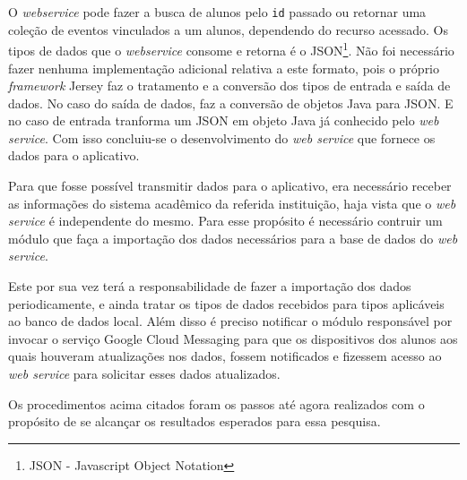 		\par O \textit{webservice} pode fazer a busca de alunos pelo \texttt{id}
passado ou retornar uma coleção de eventos vinculados a um alunos, dependendo
do recurso acessado. Os tipos de dados que o \textit{webservice} consome e
retorna é o JSON\footnote{JSON - Javascript Object Notation}. Não foi
necessário fazer nenhuma implementação adicional relativa a este formato, pois
o próprio \textit{framework} Jersey faz o tratamento e a conversão dos tipos de
entrada e saída de dados. No caso do saída de dados, faz a conversão de objetos 
Java para JSON. E no caso de entrada tranforma um JSON em objeto
Java já conhecido pelo \textit{web service}. Com isso concluiu-se o
desenvolvimento do \textit{web service} que fornece os dados para o aplicativo.

	\par Para que fosse possível transmitir dados para o aplicativo, era
necessário receber as informações do sistema acadêmico da referida instituição,
haja vista que o \textit{web service} é independente do mesmo. Para esse
propósito é necessário  contruir um módulo que faça a importação dos dados
necessários para a base de dados do \textit{web service}. 

	\par Este por sua vez terá a responsabilidade de fazer a importação dos dados
periodicamente, e ainda tratar os tipos de dados recebidos para tipos
aplicáveis ao banco de dados local. Além disso é preciso notificar o módulo
responsável por invocar o serviço Google Cloud Messaging para que os
dispositivos dos alunos aos quais houveram atualizações nos dados, fossem
notificados e fizessem acesso ao \textit{web service} para solicitar esses
dados atualizados.

	\par Os procedimentos acima citados foram os passos até agora realizados com o
propósito de se alcançar os resultados esperados para essa pesquisa.






